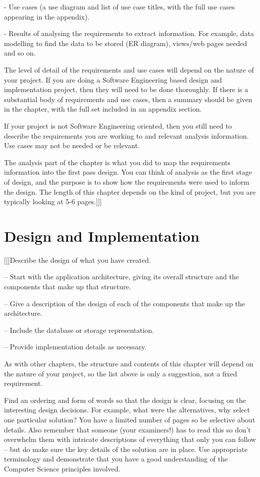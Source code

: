 \documentclass{report}
\begin{document}
- Use cases (a use diagram and list of use case titles, with the full use cases appearing in the appendix).

- Results of analysing the requirements to extract information. For example, data modelling to find the data to be stored (ER diagram), views/web pages needed and so on.

The level of detail of the requirements and use cases will depend on the nature of your project. If you are doing a Software Engineering based design and implementation project, then they will need to be done thoroughly. If there is a substantial body of requirements and use cases, then a summary should be given in the chapter, with the full set included in an appendix section.

If your project is not Software Engineering oriented, then you still need to describe the requirements you are working to and relevant analysis information. Use cases may not be needed or be relevant.

The analysis part of the chapter is what you did to map the requirements information into the first pass design. You can think of analysis as the first stage of design, and the purpose is to show how the requirements were used to inform the design. The length of this chapter depends on the kind of project, but you are typically looking at 5-6 pages.]]]


\chapter{Design and Implementation}

[[[Describe the design of what you have created.

– Start with the application architecture, giving its overall structure and the components that make up that structure.

– Give a description of the design of each of the components that make up the architecture.

– Include the database or storage representation.

– Provide implementation details as necessary.

As with other chapters, the structure and contents of this chapter will depend on the nature of your project, so the list above is only a suggestion, not a fixed requirement.

Find an ordering and form of words so that the design is clear, focusing on the interesting design decisions. For example, what were the alternatives, why select one particular solution? You have a limited number of pages so be selective about details. Also remember that someone (your examiners!) has to read this so don’t overwhelm them with intricate descriptions of everything that only you can follow – but do make sure the key details of the solution are in place. Use appropriate terminology and demonstrate that you have a good understanding of the Computer Science principles involved.
\end{document}
